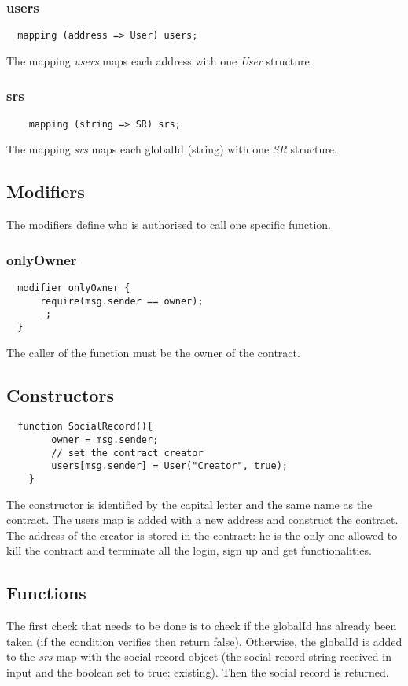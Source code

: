 \subsubsection{users}
\begin{lstlisting}
  mapping (address => User) users;
\end{lstlisting}
The mapping \textit{users} maps each address with one \textit{User} structure.
\subsubsection{srs}
\begin{lstlisting}
    mapping (string => SR) srs;
\end{lstlisting}
The mapping \textit{srs} maps each globalId (string) with one \textit{SR} structure.

\subsection{Modifiers}
The modifiers define who is authorised to call one specific function.
\subsubsection{onlyOwner}
\begin{lstlisting}
  modifier onlyOwner {
      require(msg.sender == owner);
      _;
  }
\end{lstlisting}
The caller of the function must be the owner of the contract.

\subsection{Constructors}
\begin{lstlisting}
  function SocialRecord(){
        owner = msg.sender;
        // set the contract creator
        users[msg.sender] = User("Creator", true);
    }
\end{lstlisting}
The constructor is identified by the capital letter and the same name as the contract.
The users map is added with a new address and construct the contract.
The address of the creator is stored in the contract: he is the only one allowed to kill the contract and terminate all the login, sign up and get functionalities.

\subsection{Functions}
The first check that needs to be done is to check if the globalId has already been taken (if the condition verifies then return false).
Otherwise, the globalId is added to the \textit{srs} map with the social record object (the social record string received in input and the boolean set to true: existing). Then the social record is returned.

